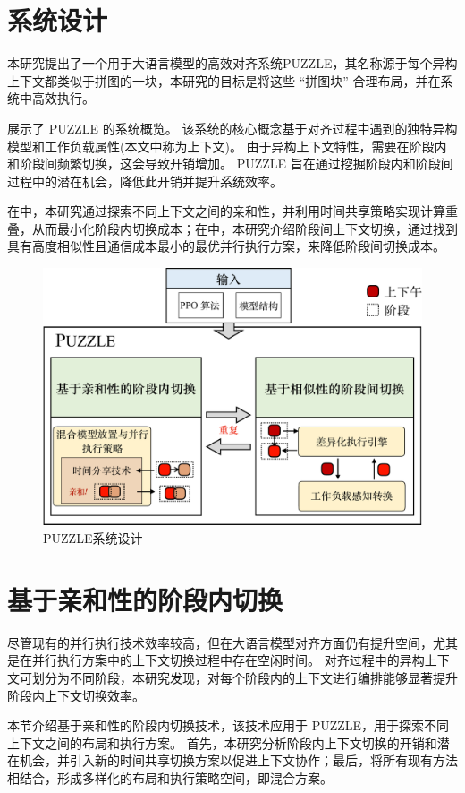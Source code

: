 \section{系统设计}
本研究提出了一个用于大语言模型的高效对齐系统PUZZLE，其名称源于每个异构上下文都类似于拼图的一块，本研究的目标是将这些 “拼图块” 合理布局，并在系统中高效执行。 

展示了 PUZZLE 的系统概览。
该系统的核心概念基于对齐过程中遇到的独特异构模型和工作负载属性(本文中称为上下文)。
由于异构上下文特性，需要在阶段内和阶段间频繁切换，这会导致开销增加。
PUZZLE 旨在通过挖掘阶段内和阶段间过程中的潜在机会，降低此开销并提升系统效率。 

在中，本研究通过探索不同上下文之间的亲和性，并利用时间共享策略实现计算重叠，从而最小化阶段内切换成本；在中，本研究介绍阶段间上下文切换，通过找到具有高度相似性且通信成本最小的最优并行执行方案，来降低阶段间切换成本。 

\begin{figure}[h]
    \centering
    \includegraphics[width=0.7\linewidth]{figures/puzzle/3-overview-crop.pdf}
    \caption{PUZZLE系统设计}
    \label{fig:overview}
\end{figure}


\section{基于亲和性的阶段内切换}
 \label{puzzle:section:intra-stage}
尽管现有的并行执行技术效率较高，但在大语言模型对齐方面仍有提升空间，尤其是在并行执行方案中的上下文切换过程中存在空闲时间。
对齐过程中的异构上下文可划分为不同阶段，本研究发现，对每个阶段内的上下文进行编排能够显著提升阶段内上下文切换效率。

本节介绍基于亲和性的阶段内切换技术，该技术应用于 PUZZLE，用于探索不同上下文之间的布局和执行方案。
首先，本研究分析阶段内上下文切换的开销和潜在机会，并引入新的时间共享切换方案以促进上下文协作；最后，将所有现有方法相结合，形成多样化的布局和执行策略空间，即混合方案。

